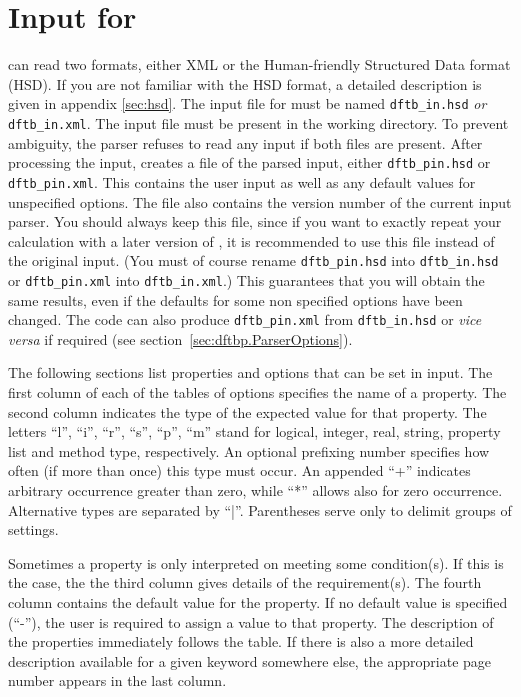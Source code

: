 \chapter{Input for {\dftbpxt}}


{\dftbp} can read two formats, either XML or the Human-friendly
Structured Data format (HSD).  If you are not familiar with the HSD
format, a detailed description is given in appendix \ref{sec:hsd}. The
input file for {\dftbp} must be named \verb|dftb_in.hsd| {\em or}
\verb|dftb_in.xml|. The input file must be present in the working
directory. To prevent ambiguity, the parser refuses to read any input
if both files are present. After processing the input, {\dftbp}
creates a file of the parsed input, either \verb|dftb_pin.hsd| or
\verb|dftb_pin.xml|. This contains the user input as well as any
default values for unspecified options.  The file also contains the
version number of the current input parser.  You should always keep
this file, since if you want to exactly repeat your calculation with a
later version of \dftbp{}, it is recommended to use this file instead
of the original input. (You must of course rename \verb|dftb_pin.hsd|
into \verb|dftb_in.hsd| or \verb|dftb_pin.xml| into
\verb|dftb_in.xml|.)  This guarantees that you will obtain the same
results, even if the defaults for some non specified options have been
changed. The code can also produce \verb|dftb_pin.xml| from
\verb|dftb_in.hsd| or {\it vice versa} if required (see
section~\ref{sec:dftbp.ParserOptions}).

The following sections list properties and options that can be set in
{\dftbp} input. The first column of each of the tables of options
specifies the name of a property. The second column indicates the type
of the expected value for that property.  The letters ``l'', ``i'',
``r'', ``s'', ``p'', ``m'' stand for logical, integer, real, string,
property list and method type, respectively. An optional prefixing
number specifies how often (if more than once) this type must occur.
An appended ``+'' indicates arbitrary occurrence greater than zero,
while ``*'' allows also for zero occurrence.  Alternative types are
separated by ``|''.  Parentheses serve only to delimit groups of
settings.

Sometimes a property is only interpreted on meeting some condition(s).  If this
is the case, the the third column gives details of the requirement(s). The
fourth column contains the default value for the property.  If no default value
is specified (``-''), the user is required to assign a value to that property.
The description of the properties immediately follows the table.  If there is
also a more detailed description available for a given keyword somewhere else,
the appropriate page number appears in the last column.


